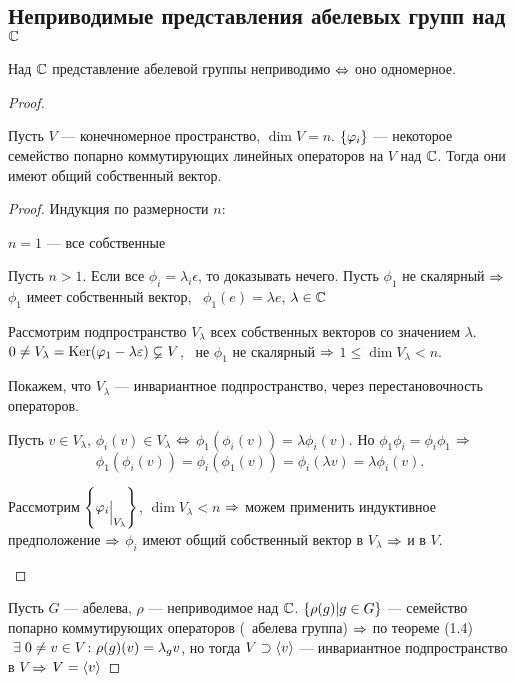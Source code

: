 \subsection{Неприводимые представления абелевых групп над $\mathbb{C}$}
\begin{theorem}
	Над $\mathbb{C}$ представление абелевой группы неприводимо $\Leftrightarrow$
	оно одномерное.
\end{theorem}
\begin{proof}
	\begin{theorem}
		Пусть $V$ --- конечномерное пространство, $\dim V = n$.
		$\left\{\varphi_i\right\}$ --- некоторое семейство попарно коммутирующих линейных
		операторов на $V$ над $\mathbb{C}$.
		Тогда они имеют общий собственный вектор.
	\end{theorem}
	\begin{proof}
		Индукция по размерности $n$:
		\begin{points}{-3}
			\item $n = 1$ --- все собственные
			\item Пусть $n > 1$. Если все $\phi_i = \lambda_i \epsilon$, то доказывать нечего.
				Пусть $\phi_1$ не скалярный $\Rightarrow$
				$\phi_1$ имеет собственный вектор, \ie\
				$\phi_1(e) = \lambda e$, $\lambda \in \mathbb{C}$

				Рассмотрим подпространство $V_{\lambda}$ всех собственных векторов
					со значением $\lambda$.
				$0 \ne V_{\lambda} = \operatorname{Ker} (\varphi_1 - \lambda \varepsilon) \varsubsetneq V$, \bt\
				не $\phi_1$ не скалярный $\Rightarrow$ $1 \le \dim V_{\lambda} < n$.

				Покажем, что $V_{\lambda}$ --- инвариантное подпространство, через перестановочность операторов.

				Пусть $v \in V_{\lambda}$, $\phi_i(v) \in V_{\lambda}$ $\Leftrightarrow$
				$\phi_1(\phi_i(v)) = \lambda \phi_i(v)$.
				Но $\phi_1 \phi_i = \phi_i \phi_1$ $\Rightarrow$
				$$
					\phi_1(\phi_i(v)) = \phi_i(\phi_1(v)) = 
					\phi_i(\lambda v ) = \lambda \phi_i(v).
				$$

				Рассмотрим $\hc{\phi_i\evn{V_{\lambda}}}$, $\dim V_{\lambda} < n$ $\Rightarrow$
				можем применить индуктивное предположение $\Rightarrow$
				$\phi_i$ имеют общий собственный вектор в $V_{\lambda}$ $\Rightarrow$ и в $V$.
		\end{points}
	\end{proof}

	Пусть $G$ --- абелева, $\rho$ --- неприводимое над $\mathbb{C}$.
	$\left\{\rho(g) | g \in G\right\}$ --- семейство попарно коммутирующих операторов (\bt\ абелева группа) $\Rightarrow$
	по теореме (1.4) $~\exists\; 0 \ne v \in V \colon \rho(g)(v) = \lambda_g v$,
	но тогда $V \supset \left\langle v\right\rangle$ --- инвариантное подпространство в $V$ $\Rightarrow$ $V = \left\langle v\right\rangle$
\end{proof}

